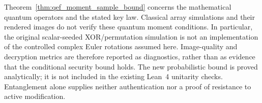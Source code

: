 {Theorem~\ref{thm:qef_moment_sample_bound} concerns the mathematical
quantum operators and the stated key law. Classical array simulations
and their rendered images do not verify these quantum moment
conditions. In particular, the original scalar-seeded XOR/permutation
simulation is not an implementation of the controlled complex
Euler rotations assumed here. Image-quality and decryption metrics
are therefore reported as diagnostics, rather than as evidence that
the conditional security bound holds. The new probabilistic bound
is proved analytically; it is not included in the existing Lean~4
unitarity checks. Entanglement alone supplies neither authentication
nor a proof of resistance to active modification.
\par}
